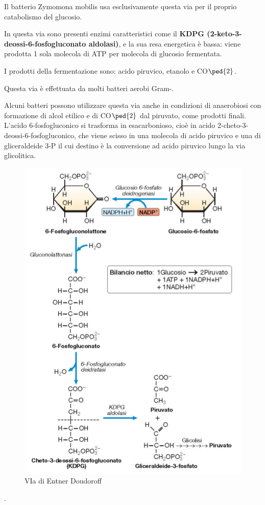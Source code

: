 \documentclass[11pt]{book}
\begin{document}
Il batterio Zymomona mobilis usa esclusivamente questa via per il proprio catabolismo del glucosio. 

\vspace{1em}
In questa via sono presenti enzimi caratteristici come il \textbf{KDPG (2-keto-3-deossi-6-fosfogluconato aldolasi)}, e la sua resa energetica è bassa: viene prodotta 1 sola molecola di ATP per molecola di glucosio fermentata. 

I prodotti della fermentazione sono: acido piruvico, etanolo e CO$\ped{2}$.

\vspace{1em}
Questa via è effettuata da molti batteri aerobi Gram-. 

Alcuni batteri possono utilizzare questa via anche in condizioni di anaerobiosi con formazione di alcol etilico e di CO$\ped{2}$ dal piruvato, come prodotti finali. L'acido 6-fosfogluconico si trasforma in esacarbonioso, cioè in acido 2-cheto-3-deossi-6-fosfogluconico, che viene scisso in una molecola di acido piruvico e una di gliceraldeide 3-P il cui destino è la conversione ad acido piruvico lungo la via glicolitica. 

\begin{figure}[htp]
\centering
\includegraphics[scale=0.4]{img/Via di Entner Doudoroff.png}
\caption{VIa di Entner Doudoroff}
\label{}
\end{figure}.
\end{document}
